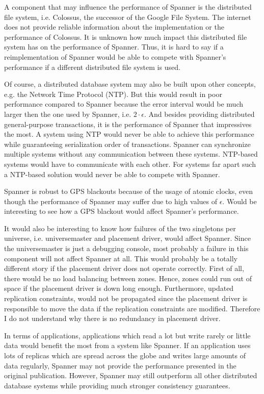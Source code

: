 \documentclass[onecolumn, a4paper, 10pt]{article}
\begin{document}
A component that may influence the performance of Spanner is the distributed
file system, i.e. Colossus, the successor of the Google File System. The internet 
does not provide reliable information about the implementation or the performance
of Colossus. It is unknown how much impact this distributed file system has on the
performance of Spanner. Thus, it is hard to say if a reimplementation of Spanner
would be able to compete with Spanner's performance if a different distributed
file system is used.

Of course, a distributed database system may also be built upon other concepts,
e.g. the Network Time Protocol (NTP). But this would result in poor performance
compared to Spanner because the error interval would be much larger then the one
used by Spanner, i.e. $2\cdot\epsilon$. And besides providing distributed
general-purpose transactions, it is the performance of Spanner that impressives
the most. A system using NTP would never be able to achieve this performance
while guaranteeing serialization order of transactions. Spanner can synchronize
multiple systems without any communication between these systems. NTP-based
systems would have to communicate with each other. For systems far apart such a
NTP-based solution would never be able to compete with Spanner.

Spanner is robust to GPS blackouts because of the usage of atomic clocks, even
though the performance of Spanner may suffer due to high values of $\epsilon$.
Would be interesting to see how a GPS blackout would affect Spanner's performance.

It would also be interesting to know how failures of the two singletons per
universe, i.e. universemaster and placement driver, would affect Spanner. Since
the universemaster is just a debugging console, most probably a failure in this
component will not affect Spanner at all. This would probably be a totally
different story if the placement driver does not operate correctly. First of all,
there would be no load balancing between zones. Hence, zones could run out of
space if the placement driver is down long enough. Furthermore, updated
replication constraints, would not be propagated since the placement driver is
responsible to move the data if the replication constraints are modified.
Therefore I do not understand why there is no redundancy in placement driver.

In terms of applications, applications which read a lot but write rarely or little
data would benefit the most from a system like Spanner. If an application uses
lots of replicas which are spread across the globe and writes large amounts of data
regularly, Spanner may not provide the performance presented in the original
publication. However, Spanner may still outperform all other distributed database
systems while providing much stronger consistency guarantees.



\end{document}
